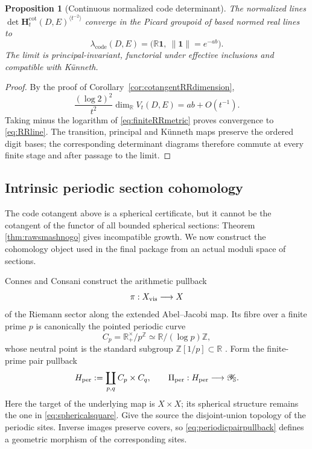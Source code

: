 \documentclass[11pt]{amsart}
\newtheorem{proposition}[theorem]{Proposition}
\theoremstyle{definition}
\theoremstyle{remark}
\newcommand{\R}{\mathbb R}
\newcommand{\Z}{\mathbb Z}
\begin{document}
\begin{proposition}[Continuous normalized code determinant]
\label{prop:continuousRRdet}
The normalized lines
$\det\mathbf H_t^{\mathrm{cot}}(D,E)^{\langle t^{-2}\rangle}$ converge in
the Picard groupoid of based normed real lines to
\begin{equation}\label{eq:RRline}
 \lambda_{\mathrm{code}}(D,E)
   =\bigl(\R\mathbf1,\ \|\mathbf1\|=e^{-ab}\bigr).
\end{equation}
The limit is principal-invariant, functorial under effective inclusions and
compatible with K\"unneth.
\end{proposition}

\begin{proof}
By the proof of Corollary~\ref{cor:cotangentRRdimension},
\[
 \frac{(\log2)^2}{t^2}\dim_{\R}V_t(D,E)=ab+O(t^{-1}).
\]
Taking minus the logarithm of \eqref{eq:finiteRRmetric} proves convergence
to \eqref{eq:RRline}.  The transition, principal and K\"unneth maps preserve
the ordered digit bases; the corresponding determinant diagrams therefore
commute at every finite stage and after passage to the limit.
\end{proof}


\subsection{Intrinsic periodic section cohomology}
\label{subsec:intrinsicperiodic}

The code cotangent above is a spherical certificate, but it cannot be the
cotangent of the functor of all bounded spherical sections: Theorem
\ref{thm:rawsmashnogo} gives incompatible growth.  We now construct the
cohomology object used in the final package from an actual moduli space of
sections.

Connes and Consani construct the arithmetic pullback
\[
 \pi:X_{\rm vis}\longrightarrow X
\]
of the Riemann sector along the extended Abel--Jacobi map.  Its fibre over a
finite prime $p$ is canonically the pointed periodic curve
\begin{equation}\label{eq:periodicfiber}
 C_p=\R_+^\times/p^\Z\simeq\R/(\log p)\Z,
\end{equation}
whose neutral point is the standard subgroup $\Z[1/p]\subset\R$
\cite[\S6.3]{CCJacobian}.  Form the finite-prime pair pullback
\begin{equation}\label{eq:periodicpairpullback}
 H_{\rm per}:=\coprod_{p,q}C_p\times C_q,
 \qquad
 \Pi_{\rm per}:H_{\rm per}\longrightarrow\mathscr Y_{\mathbb S}.
\end{equation}
Here the target of the underlying map is $X\times X$; its spherical
structure remains the one in \eqref{eq:sphericalsquare}.  Give the source
the disjoint-union topology of the periodic sites.  Inverse images preserve
covers, so \eqref{eq:periodicpairpullback} defines a geometric morphism of
the corresponding sites.
\end{document}
